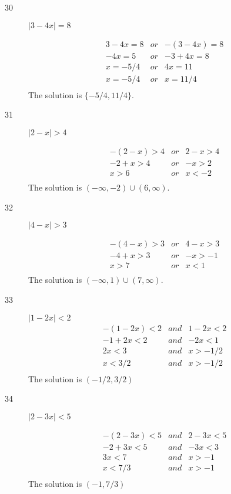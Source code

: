 \documentclass[fleqn,addpoints]{exam}
\begin{document}
\begin{description}
\item[30]

\( | 3 - 4x | = 8 \)

\begin{eqnarray*}
  3 - 4x = 8 &or& -(3 - 4x) = 8 \\
   -4x = 5 &or& -3 + 4x = 8 \\
   x = -5/4 &or& 4x = 11 \\
   x = -5/4 &or& x = 11/4 \\
\end{eqnarray*}
The solution is \( \{-5/4, 11/4\} \).

\item[31]

\( | 2 - x | > 4 \)

\begin{eqnarray*}
  -(2 - x) > 4 &or& 2 - x > 4 \\
  -2 + x > 4 &or&  -x > 2 \\
  x > 6 &or&  x < -2 \\
\end{eqnarray*}
The solution is \( (-\infty, -2) \cup (6, \infty) \).

\item[32]

\( | 4 - x | > 3 \)

\begin{eqnarray*}
  -(4 - x) > 3 &or& 4 - x > 3 \\
  -4 + x > 3 &or&  -x > -1 \\
  x > 7 &or&  x < 1 \\
\end{eqnarray*}
The solution is \( (-\infty, 1) \cup (7, \infty) \).

\item[33]

\( | 1 - 2x | < 2 \)
\begin{eqnarray*}
  -(1 - 2x) < 2 &and& 1 - 2x < 2 \\
  -1 + 2x < 2 &and& -2x < 1 \\
  2x < 3 &and& x > -1/2 \\
  x < 3/2 &and& x > -1/2 \\
\end{eqnarray*}
The solution is \( (-1/2, 3/2) \)

\item[34]

\( | 2 - 3x | < 5 \)

\begin{eqnarray*}
  -(2 - 3x) < 5 &and& 2 - 3x < 5 \\
  -2 + 3x < 5 &and& -3x < 3 \\
  3x < 7 &and& x > -1 \\
  x < 7/3 &and& x > -1 \\
\end{eqnarray*}
The solution is \( (-1, 7/3) \)


\end{description}
\end{document}
